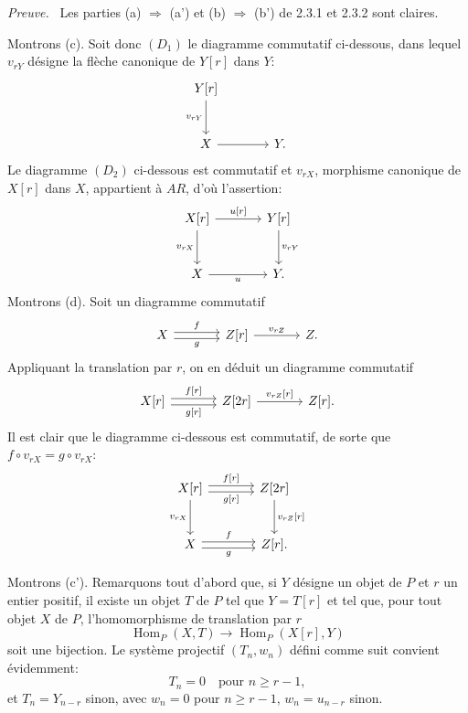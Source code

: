 \documentclass[11pt]{article}
\newenvironment{prooftext}[1][Proof]{\par\noindent\emph{#1.}\ }{\par\medskip}
\DeclareMathOperator{\Hom}{Hom}
\providecommand{\Hom}{\operatorname{Hom}}
\begin{document}
\begin{prooftext}[Preuve]
Les parties (a) $\Rightarrow$ (a') et (b) $\Rightarrow$ (b') de 2.3.1 et 2.3.2 sont claires.

Montrons (c). Soit donc $(D_1)$ le diagramme commutatif ci-dessous, dans lequel $v_{rY}$ désigne la flèche canonique de $Y[r]$ dans $Y$:
\[
\begin{tikzcd}[column sep=large,row sep=large]
Y[r] \arrow[d,"{v_{rY}}"']\\
X \arrow[r] & Y .
\end{tikzcd}
\]
Le diagramme $(D_2)$ ci-dessous est commutatif et $v_{rX}$, morphisme canonique de $X[r]$ dans $X$, appartient à $AR$, d'où l'assertion:
\[
\begin{tikzcd}[column sep=large,row sep=large]
X[r] \arrow[r,"{u[r]}"] \arrow[d,"{v_{rX}}"'] & Y[r] \arrow[d,"{v_{rY}}"]\\
X \arrow[r,"u"'] & Y .
\end{tikzcd}
\]
Montrons (d). Soit un diagramme commutatif
\[
\begin{tikzcd}[column sep=large]
X \arrow[r,shift left,"f"] \arrow[r,shift right,"g"'] & Z[r] \arrow[r,"{v_{rZ}}"] & Z .
\end{tikzcd}
\]
Appliquant la translation par $r$, on en déduit un diagramme commutatif
\[
\begin{tikzcd}[column sep=large]
X[r] \arrow[r,shift left,"{f[r]}"] \arrow[r,shift right,"{g[r]}"'] & Z[2r] \arrow[r,"{v_{rZ}[r]}"] & Z[r].
\end{tikzcd}
\]
Il est clair que le diagramme ci-dessous est commutatif, de sorte que $f\circ v_{rX}=g\circ v_{rX}$:
\[
\begin{tikzcd}[column sep=large,row sep=large]
X[r] \arrow[r,shift left,"{f[r]}"] \arrow[r,shift right,"{g[r]}"'] \arrow[d,"{v_{rX}}"'] & Z[2r] \arrow[d,"{v_{rZ}[r]}"]\\
X \arrow[r,shift left,"f"] \arrow[r,shift right,"g"'] & Z[r] .
\end{tikzcd}
\]

Montrons (c'). Remarquons tout d'abord que, si $Y$ désigne un objet de $P$ et $r$ un entier positif, il existe un objet $T$ de $P$ tel que $Y=T[r]$ et tel que, pour tout objet $X$ de $P$, l'homomorphisme de translation par $r$
\[
\Hom_P(X,T)\longrightarrow\Hom_P(X[r],Y)
\]
soit une bijection. Le système projectif $(T_n,w_n)$ défini comme suit convient évidemment:
\[
T_n=0\quad\text{pour } n\ge r-1,
\]
et $T_n=Y_{n-r}$ sinon, avec $w_n=0$ pour $n\ge r-1$, $w_n=u_{n-r}$ sinon.


\end{prooftext}
\end{document}
